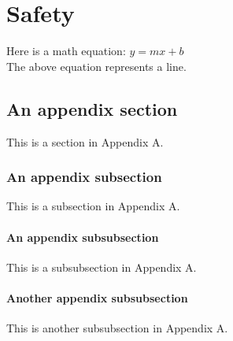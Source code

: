 \chapter{Safety} \label{appendixA}

Here is a math equation: $y = mx + b$\\
The above equation represents a line.

\section{An appendix section} \label{appAsect}

This is a section in Appendix A.

\subsection{An appendix subsection} \label{appAsubsect}

This is a subsection in Appendix A.

\subsubsection{An appendix subsubsection} \label{appAsubsubsect}

This is a subsubsection in Appendix A.

\subsubsection{Another appendix subsubsection} \label{appAsubsubsect2}

This is another subsubsection in Appendix A.
